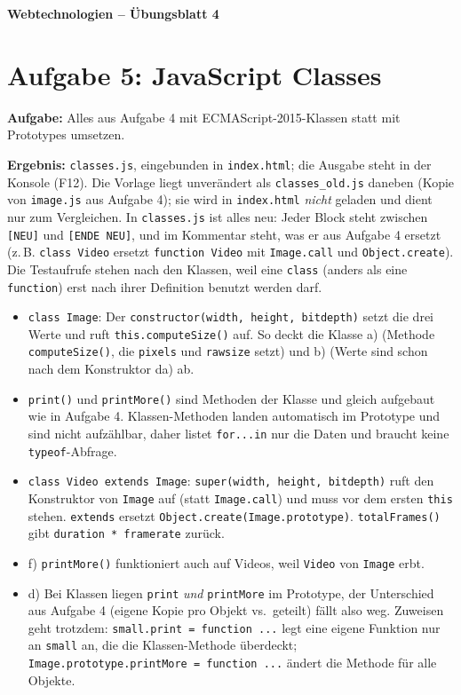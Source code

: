 \documentclass[11pt,a4paper]{article}
\begin{document}
\begin{center}
  {\Large\textbf{Webtechnologien -- Übungsblatt 4}}
\end{center}
\section*{Aufgabe 5: JavaScript Classes}
\textbf{Aufgabe:} Alles aus Aufgabe 4 mit ECMAScript-2015-Klassen statt
mit Prototypes umsetzen.

\medskip
\textbf{Ergebnis:} \texttt{classes.js}, eingebunden in
\texttt{index.html}; die Ausgabe steht in der Konsole (F12).
Die Vorlage liegt unverändert als \texttt{classes\_old.js} daneben (Kopie
von \texttt{image.js} aus Aufgabe 4); sie wird in \texttt{index.html}
\emph{nicht} geladen und dient nur zum Vergleichen. In
\texttt{classes.js} ist alles neu: Jeder Block steht zwischen
\texttt{[NEU]} und \texttt{[ENDE NEU]}, und im Kommentar steht, was er aus
Aufgabe 4 ersetzt (z.\,B. \texttt{class Video} ersetzt \texttt{function
Video} mit \texttt{Image.call} und \texttt{Object.create}). Die Testaufrufe
stehen nach den Klassen, weil eine \texttt{class} (anders als eine
\texttt{function}) erst nach ihrer Definition benutzt werden darf.
\begin{itemize}
  \item \texttt{class Image}: Der \texttt{constructor(width, height,
    bitdepth)} setzt die drei Werte und ruft \texttt{this.computeSize()}
    auf. So deckt die Klasse a) (Methode \texttt{computeSize()}, die
    \texttt{pixels} und \texttt{rawsize} setzt) und b) (Werte sind schon
    nach dem Konstruktor da) ab.
  \item \texttt{print()} und \texttt{printMore()} sind Methoden der Klasse
    und gleich aufgebaut wie in Aufgabe 4. Klassen-Methoden landen
    automatisch im Prototype und sind nicht aufzählbar, daher listet
    \texttt{for...in} nur die Daten und braucht keine
    \texttt{typeof}-Abfrage.
  \item \texttt{class Video extends Image}: \texttt{super(width, height,
    bitdepth)} ruft den Konstruktor von \texttt{Image} auf (statt
    \texttt{Image.call}) und muss vor dem ersten \texttt{this} stehen.
    \texttt{extends} ersetzt \texttt{Object.create(Image.prototype)}.
    \texttt{totalFrames()} gibt \texttt{duration * framerate} zurück.
  \item f) \texttt{printMore()} funktioniert auch auf Videos, weil
    \texttt{Video} von \texttt{Image} erbt.
  \item d) Bei Klassen liegen \texttt{print} \emph{und}
    \texttt{printMore} im Prototype, der Unterschied aus Aufgabe 4
    (eigene Kopie pro Objekt vs.\ geteilt) fällt also weg. Zuweisen geht
    trotzdem: \texttt{small.print = function ...} legt eine eigene
    Funktion nur an \texttt{small} an, die die Klassen-Methode überdeckt;
    \texttt{Image.prototype.printMore = function ...} ändert die Methode
    für alle Objekte.
\end{itemize}
\end{document}

